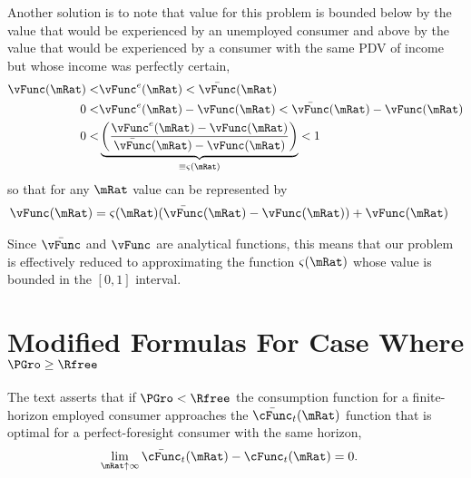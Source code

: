 \documentclass{\handout}
\begin{document}
\begin{CDCPrivate}
Another solution is to note that value for this problem is bounded below by the value 
that would be experienced by an unemployed consumer and above by the value that 
would be experienced by a consumer with the same PDV of income but whose income
was perfectly certain,
\begin{equation}\begin{gathered}\begin{aligned}
    \vFunc(\mRat) < &  \vFunc^{e}(\mRat)   < \bar{\vFunc}(\mRat)
\\  0 < & \vFunc^{e}(\mRat)-\vFunc(\mRat)   < \bar{\vFunc}(\mRat)-\vFunc(\mRat)
\\  0 < & \underbrace{\left(\frac{\vFunc^{e}(\mRat)-\vFunc(\mRat)}{\bar{\vFunc}(\mRat)-\vFunc(\mRat)}\right)}_{\equiv \varsigma(\mRat)}  < 1
\end{aligned}\end{gathered}\end{equation}
so that for any $\mRat$ value can be represented by 
\begin{equation}\begin{gathered}\begin{aligned}
  \vFunc(\mRat) & =  \varsigma(\mRat)(\bar{\vFunc}(\mRat)-\vFunc(\mRat))+\vFunc(\mRat)
\end{aligned}\end{gathered}\end{equation}


Since $\bar{\vFunc}$ and $\vFunc$ are analytical functions, this means that 
our problem is effectively reduced to approximating the function $\varsigma(\mRat)$ 
whose value is bounded in the $[0,1]$ interval.


\end{CDCPrivate}



\section{Modified Formulas For Case Where $\PGro \geq \Rfree$} \label{sec:PGroGEQRfree}

The text asserts that if $\PGro < \Rfree$ the consumption function for a finite-horizon employed consumer approaches
the $\bar{\cFunc}_{t}(\mRat)$ function that is optimal for a perfect-foresight
consumer with the same horizon,
\begin{equation}\begin{gathered}\begin{aligned}
  \lim_{\mRat \uparrow \infty} \bar{\cFunc}_{t}(\mRat) - \cFunc_{t}(\mRat) & =  0
.
\end{aligned}\end{gathered}\end{equation}
\end{document}
